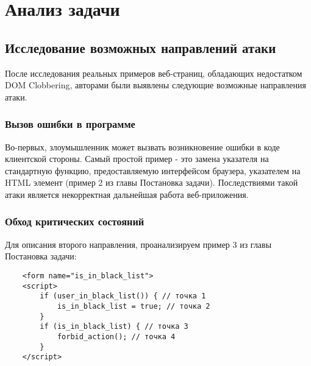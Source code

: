 
\chapter{Анализ задачи}\label{Analysis}

\section{Исследование возможных направлений атаки}

После исследования реальных примеров веб-страниц, обладающих недостатком DOM Clobbering, авторами были выявлены следующие возможные направления атаки.
\bigskip

\subsection{Вызов ошибки в программе}
Во-первых, злоумышленник может вызвать возникновение ошибки в коде клиентской стороны. Самый простой пример - это замена указателя на стандартную функцию, предоставляемую интерфейсом браузера, указателем на HTML элемент (пример 2 из главы Постановка задачи). Последствиями такой атаки является некорректная дальнейшая работа веб-приложения.


\subsection{Обход критических состояний}
Для описания второго направления, проанализируем пример 3 из главы Постановка задачи:

\begin{lstlisting}
	<form name="is_in_black_list">
	<script>
		if (user_in_black_list()) { // точка 1
			is_in_black_list = true; // точка 2
		}
		if (is_in_black_list) { // точка 3
			forbid_action(); // точка 4
		}
	</script>
\end{lstlisting}
\bigskip

